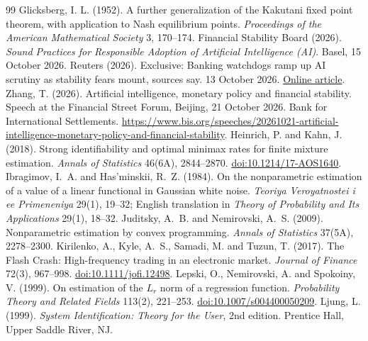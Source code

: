 \begin{thebibliography}{99}
 Glicksberg, I. L. (1952). A further generalization of the Kakutani fixed point theorem, with application to Nash equilibrium points. \emph{Proceedings of the American Mathematical Society} 3, 170--174.
 Financial Stability Board (2026). \emph{Sound Practices for Responsible Adoption of Artificial Intelligence (AI)}. Basel, 15 October 2026.
 Reuters (2026). Exclusive: Banking watchdogs ramp up AI scrutiny as stability fears mount, sources say. 13 October 2026. \href{https://money.usnews.com/investing/news/articles/2026-10-13/exclusive-banking-watchdogs-ramp-up-ai-scrutiny-as-stability-fears-mount-sources-say}{Online article}.
 Zhang, T. (2026). Artificial intelligence, monetary policy and financial stability. Speech at the Financial Street Forum, Beijing, 21 October 2026. Bank for International Settlements. \url{https://www.bis.org/speeches/20261021-artificial-intelligence-monetary-policy-and-financial-stability}.
 Heinrich, P. and Kahn, J. (2018). Strong identifiability and optimal minimax rates for finite mixture estimation. \emph{Annals of Statistics} 46(6A), 2844--2870. \href{https://doi.org/10.1214/17-AOS1640}{doi:10.1214/17-AOS1640}.
 Ibragimov, I.~A. and Has'minskii, R.~Z. (1984). On the nonparametric estimation of a value of a linear functional in Gaussian white noise. \emph{Teoriya Veroyatnostei i ee Primeneniya} 29(1), 19--32; English translation in \emph{Theory of Probability and Its Applications} 29(1), 18--32.
 Juditsky, A.~B. and Nemirovski, A.~S. (2009). Nonparametric estimation by convex programming. \emph{Annals of Statistics} 37(5A), 2278--2300.
 Kirilenko, A., Kyle, A.~S., Samadi, M. and Tuzun, T. (2017). The Flash Crash: High-frequency trading in an electronic market. \emph{Journal of Finance} 72(3), 967--998. \href{https://doi.org/10.1111/jofi.12498}{doi:10.1111/jofi.12498}.
 Lepski, O., Nemirovski, A. and Spokoiny, V. (1999). On estimation of the $L_r$ norm of a regression function. \emph{Probability Theory and Related Fields} 113(2), 221--253. \href{https://doi.org/10.1007/s004400050209}{doi:10.1007/s004400050209}.
 Ljung, L. (1999). \emph{System Identification: Theory for the User}, 2nd edition. Prentice Hall, Upper Saddle River, NJ.

\end{thebibliography}
